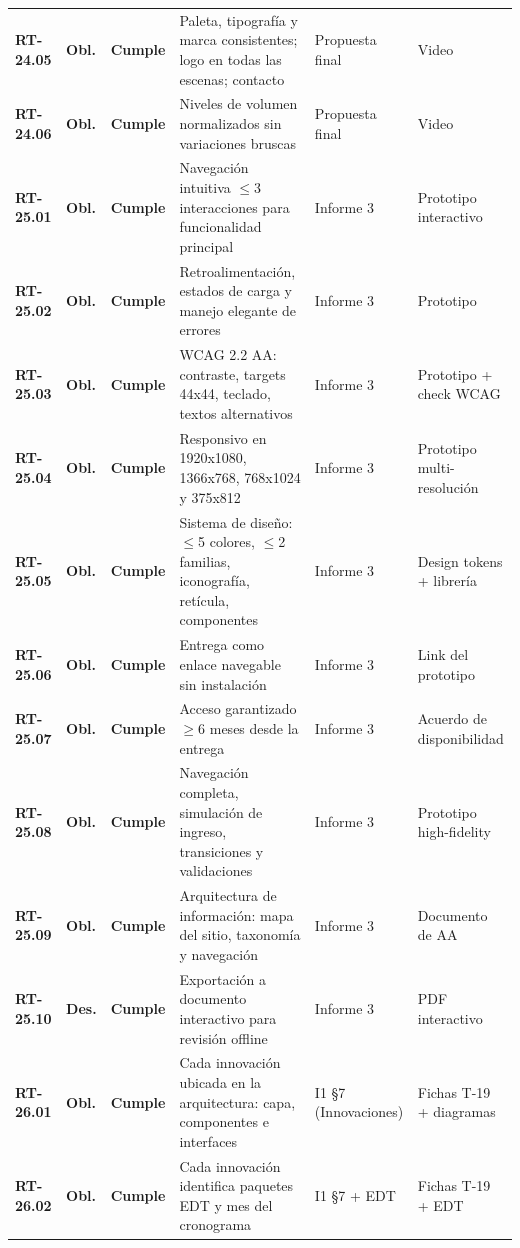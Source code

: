 \begin{small}
\begin{longtable}{@{}p{1.35cm} p{1.15cm} p{1.15cm} p{4.6cm} p{2.35cm} p{3.8cm}@{}}
\textbf{RT-24.05} & \textbf{Obl.} & \textbf{Cumple} & Paleta, tipograf\'ia y marca consistentes; logo en todas las escenas; contacto & Propuesta final & Video \\
\textbf{RT-24.06} & \textbf{Obl.} & \textbf{Cumple} & Niveles de volumen normalizados sin variaciones bruscas & Propuesta final & Video \\
\textbf{RT-25.01} & \textbf{Obl.} & \textbf{Cumple} & Navegaci\'on intuitiva $\leq$3 interacciones para funcionalidad principal & Informe 3 & Prototipo interactivo \\
\textbf{RT-25.02} & \textbf{Obl.} & \textbf{Cumple} & Retroalimentaci\'on, estados de carga y manejo elegante de errores & Informe 3 & Prototipo \\
\textbf{RT-25.03} & \textbf{Obl.} & \textbf{Cumple} & WCAG 2.2 AA: contraste, targets 44x44, teclado, textos alternativos & Informe 3 & Prototipo + check WCAG \\
\textbf{RT-25.04} & \textbf{Obl.} & \textbf{Cumple} & Responsivo en 1920x1080, 1366x768, 768x1024 y 375x812 & Informe 3 & Prototipo multi-resoluci\'on \\
\textbf{RT-25.05} & \textbf{Obl.} & \textbf{Cumple} & Sistema de dise\~no: $\leq$5 colores, $\leq$2 familias, iconograf\'ia, ret\'icula, componentes & Informe 3 & Design tokens + librer\'ia \\
\textbf{RT-25.06} & \textbf{Obl.} & \textbf{Cumple} & Entrega como enlace navegable sin instalaci\'on & Informe 3 & Link del prototipo \\
\textbf{RT-25.07} & \textbf{Obl.} & \textbf{Cumple} & Acceso garantizado $\geq$6 meses desde la entrega & Informe 3 & Acuerdo de disponibilidad \\
\textbf{RT-25.08} & \textbf{Obl.} & \textbf{Cumple} & Navegaci\'on completa, simulaci\'on de ingreso, transiciones y validaciones & Informe 3 & Prototipo high-fidelity \\
\textbf{RT-25.09} & \textbf{Obl.} & \textbf{Cumple} & Arquitectura de informaci\'on: mapa del sitio, taxonom\'ia y navegaci\'on & Informe 3 & Documento de AA \\
\textbf{RT-25.10} & \textbf{Des.} & \textbf{Cumple} & Exportaci\'on a documento interactivo para revisi\'on offline & Informe 3 & PDF interactivo \\
\textbf{RT-26.01} & \textbf{Obl.} & \textbf{Cumple} & Cada innovaci\'on ubicada en la arquitectura: capa, componentes e interfaces & I1 §7 (Innovaciones) & Fichas T-19 + diagramas \\
\textbf{RT-26.02} & \textbf{Obl.} & \textbf{Cumple} & Cada innovaci\'on identifica paquetes EDT y mes del cronograma & I1 §7 + EDT & Fichas T-19 + EDT \\

\end{longtable}
\end{small}
